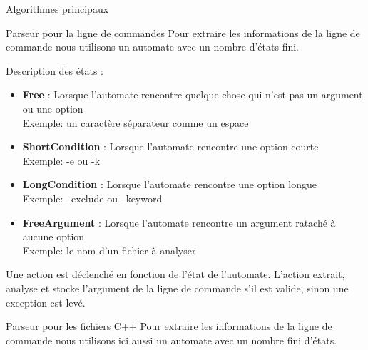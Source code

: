 \documentclass{article}
\begin{document}
\begin{section}{Algorithmes principaux}

  \begin{subsection}{Parseur pour la ligne de commandes}
  Pour extraire les informations de la ligne de commande nous utilisons un automate avec un nombre d'états fini.
  
  \begin{paragraph}{Description des états :}
    \begin{itemize}
      \item \textbf{Free} : Lorsque l'automate rencontre quelque chose qui n'est pas un argument ou une option \\Exemple: un caractère séparateur comme un espace
      \item \textbf{ShortCondition} : Lorsque l'automate rencontre une option courte \\Exemple: -e ou -k
      \item \textbf{LongCondition} : Lorsque l'automate rencontre une option longue \\Exemple: --exclude ou --keyword
      \item \textbf{FreeArgument} : Lorsque l'automate rencontre un argument rataché à aucune option\\Exemple: le nom d'un fichier à analyser\\
    \end{itemize}
  \end{paragraph}
  
  Une action est déclenché en fonction de l'état de l'automate. L'action extrait, analyse et stocke l'argument de la ligne de commande s'il est valide, sinon une exception est levé.
  \end{subsection}

  \begin{subsection}{Parseur pour les fichiers C++}
  Pour extraire les informations de la ligne de commande nous utilisons ici aussi un automate avec un nombre fini d'états.
  

\end{subsection}
\end{section}
\end{document}
